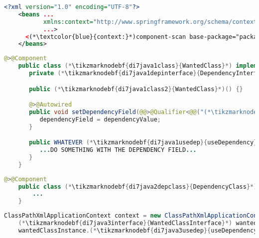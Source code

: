 \begin{lstlisting}[language=XML, title={Configuration XML}]
    <?xml version="1.0" encoding="UTF-8"?>
    <beans ...
           xmlns:context="http://www.springframework.org/schema/context"
           ...>
      <(*\textcolor{blue}{context:}*)component-scan base-package="package.subfolder"/>
    </beans>
\end{lstlisting}
\begin{lstlisting}[language=Java, title={Wanted class with the zero--parameter constructor and the setter method}]
    @>@Component
    public class (*\tikzmarknodebf{di7java1class}{WantedClass}*) implements (*\tikzmarknodebf{di7java1interface}{WantedClassInterface}*) {
       private (*\tikzmarknodebf{di7java1depinterface}{DependencyInterface}*) dependencyField;

       public (*\tikzmarknodebf{di7java1class2}{WantedClass}*)() {}

       @>@Autowired
       public void setDependencyField(@@>@Qualifier<@@("(*\tikzmarknodebf{di7java1depbeanid}{dependencyClass}[ForestGreen]*)") (*\tikzmarknodebf{di7java1depinterface2}{DependencyInterface}*) dependencyValue) {
          dependencyField = dependencyValue;
       }

       public WHATEVER (*\tikzmarknodebf{di7java1usedep}{useDependency}*)() {
          ...DO SOMETHING WITH THE DEPENDENCY FIELD...
       }
    }
\end{lstlisting}
\begin{lstlisting}[language=Java, title={Dependency class}]
    @>@Component
    public class (*\tikzmarknodebf{di7java2depclass}{DependencyClass}*) implements (*\tikzmarknodebf{di7java2depinterface}{DependencyInterface}*) {
        ...
    }
\end{lstlisting}
\begin{lstlisting}[language=Java, title={Usage}]
    ClassPathXmlApplicationContext context = new ClassPathXmlApplicationContext("configurationFile.xml");
    (*\tikzmarknodebf{di7java3interface}{WantedClassInterface}*) wantedClassInstance = context.getBean("(*\tikzmarknodebf{di7java3beanid}{wantedClass}[ForestGreen]*)", (*\tikzmarknodebf{di7java3interface2}{WantedClassInterface}*).class);
    wantedClassInstance.(*\tikzmarknodebf{di7java3usedep}{useDependency}*)();
\end{lstlisting}
\newpage

